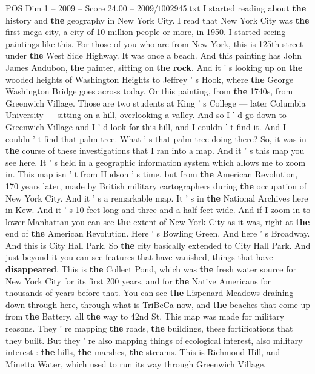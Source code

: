 \begin{textsample}{POS Dim 1 – 2009 – Score 24.00 – 2009/t002945.txt}
I started reading about \textbf{the} history and \textbf{the} geography in New York City.
I read that New York City was \textbf{the} first mega-city, a city of 10 million people or more, in 1950.
I started seeing paintings like this.
For those of you who are from New York, this is 125th street under \textbf{the} West Side Highway.
It was once a beach.
And this painting has John James Audubon, \textbf{the} painter, sitting on \textbf{the} \textbf{rock}.
And it ' s looking up on \textbf{the} wooded heights of Washington Heights to Jeffrey ' s Hook, where \textbf{the} George Washington Bridge goes across today.
Or this painting, from \textbf{the} 1740s, from Greenwich Village.
Those are two students at King ' s College — later Columbia University — sitting on a hill, overlooking a valley.
And so I ' d go down to Greenwich Village and I ' d look for this hill, and I couldn ' t find it.
And I couldn ' t find that palm tree.
What ' s that palm tree doing there?
So, it was in \textbf{the} course of these investigations that I ran into a map.
And it ' s this map you see here.
It ' s held in a geographic information system which allows me to zoom in.
This map isn ' t from Hudson ' s time, but from \textbf{the} American Revolution, 170 years later, made by British military cartographers during \textbf{the} occupation of New York City.
And it ' s a remarkable map.
It ' s in \textbf{the} National Archives here in Kew.
And it ' s 10 feet long and three and a half feet wide.
And if I zoom in to lower Manhattan you can see \textbf{the} extent of New York City as it was, right at \textbf{the} end of \textbf{the} American Revolution.
Here ' s Bowling Green.
And here ' s Broadway.
And this is City Hall Park.
So \textbf{the} city basically extended to City Hall Park.
And just beyond it you can see features that have vanished, things that have \textbf{disappeared}.
This is \textbf{the} Collect Pond, which was \textbf{the} fresh water source for New York City for its first 200 years, and for \textbf{the} Native Americans for thousands of years before that.
You can see \textbf{the} Lispenard Meadows draining down through here, through what is TriBeCa now, and \textbf{the} beaches that come up from \textbf{the} Battery, all \textbf{the} way to 42nd St.
This map was made for military reasons.
They ' re mapping \textbf{the} roads, \textbf{the} buildings, these fortifications that they built.
But they ' re also mapping things of ecological interest, also military interest : \textbf{the} hills, \textbf{the} marshes, \textbf{the} streams.
This is Richmond Hill, and Minetta Water, which used to run its way through Greenwich Village.

\end{textsample}
